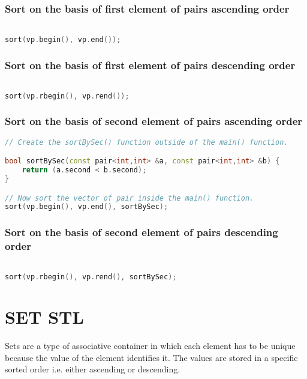\subsubsection{Sort on the basis of first element of pairs ascending order}
\begin{lstlisting}[language=c++]

sort(vp.begin(), vp.end());

\end{lstlisting}

\subsubsection{Sort on the basis of first element of pairs descending order}
\begin{lstlisting}[language=c++]

sort(vp.rbegin(), vp.rend());

\end{lstlisting}

\subsubsection{Sort on the basis of second element of pairs ascending order}
\begin{lstlisting}[language=c++]
// Create the sortBySec() function outside of the main() function.

bool sortBySec(const pair<int,int> &a, const pair<int,int> &b) {
	return (a.second < b.second);
}

// Now sort the vector of pair inside the main() function.
sort(vp.begin(), vp.end(), sortBySec);

\end{lstlisting}

\subsubsection{Sort on the basis of second element of pairs descending order}
\begin{lstlisting}[language=c++]

sort(vp.rbegin(), vp.rend(), sortBySec);

\end{lstlisting}


\newpage
\section{\textbf{SET STL}}
Sets are a type of associative container in which each element has to be unique because the value of the element identifies it. The values are stored in a specific sorted order i.e. either ascending or descending.

